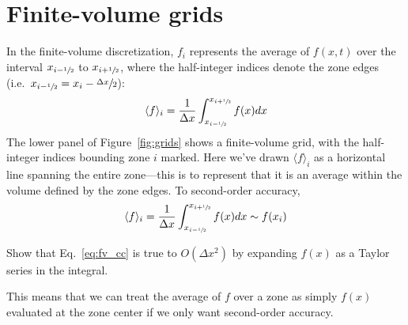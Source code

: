 \section{Finite-volume grids}

In the finite-volume discretization, $f_i$ represents the average of
$f(x,t)$ over the interval $x_{i-\sfrac{1}{2}}$ to $x_{i+\sfrac{1}{2}}$, where the
half-integer indices denote the zone edges (i.e.\ $x_{i-\sfrac{1}{2}} = x_i -\sfrac{\Delta x}{2}$):
\begin{equation}
\label{eq:fv_cc-a}
\langle f\rangle_i = \frac{1}{\Delta x} \int_{x_{i-\sfrac{1}{2}}}^{x_{i+\sfrac{1}{2}}} f(x) dx
\end{equation}
The lower panel of Figure~\ref{fig:grids} shows a finite-volume grid,
with the half-integer indices bounding zone $i$ marked.
%
%
Here we've drawn $\langle f\rangle_i$ as a horizontal line spanning the entire zone---this
is to represent that it is an average within the volume defined by the zone
edges.
%
To second-order accuracy,
\begin{equation}
\label{eq:fv_cc}
\langle f\rangle_i = \frac{1}{\Delta x} \int_{x_{i-\sfrac{1}{2}}}^{x_{i+\sfrac{1}{2}}} f(x) dx \sim f(x_i)
\end{equation}

\begin{exercise}
{Show that Eq.~\ref{eq:fv_cc} is true to $O(\Delta x^2)$ by expanding
$f(x)$ as a Taylor series in the integral.}
\end{exercise}

This means that we can treat the average of $f$ over a zone as simply $f(x)$
evaluated at the zone center if we only want second-order accuracy.


